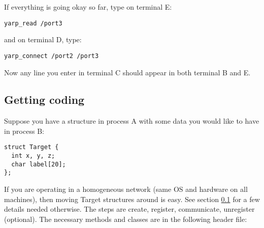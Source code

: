 If everything is going okay so far, type on terminal E:
%
\begin{verbatim}
yarp_read /port3
\end{verbatim}
%
and on terminal D, type:
%
\begin{verbatim}
yarp_connect /port2 /port3
\end{verbatim}
%
Now any line you enter in terminal C should appear in both terminal B and E.



\subsection{Getting coding}

Suppose you have a structure  in process A with some data
you would like to have in process B:
%
\begin{verbatim}
struct Target {
  int x, y, z;
  char label[20];
};
\end{verbatim}
%
If you are operating in a homogeneous network (same OS and hardware on
all machines), then moving Target structures around is easy.  See
section \ref{} for a few details needed otherwise.
%
The steps are create, register, communicate, unregister (optional).
The necessary methods and classes are in the following header file:

